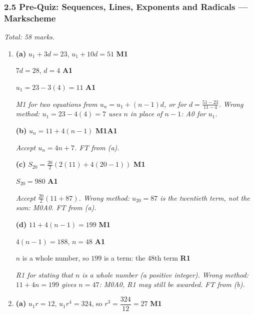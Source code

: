 \documentclass[12pt, twoside]{article}
\begin{document}
\subsubsection*{2.5 Pre-Quiz: Sequences, Lines, Exponents and Radicals --- Markscheme}

\emph{Total: 58 marks.}

\begin{enumerate}[itemsep=0.3cm]

\item[1.] [Maximum mark: 10]

\textbf{(a)} $u_{1} + 3d = 23$, \quad $u_{1} + 10d = 51$ \hfill \textbf{M1}

$7d = 28$, \quad $d = 4$ \hfill \textbf{A1}

$u_{1} = 23 - 3(4) = 11$ \hfill \textbf{A1}

\emph{M1 for two equations from $u_{n} = u_{1} + (n - 1)d$, or for
$d = \frac{51 - 23}{11 - 4}$. Wrong method: $u_{1} = 23 - 4(4) = 7$ uses
$n$ in place of $n - 1$: A0 for $u_{1}$.}

\textbf{(b)} $u_{n} = 11 + 4(n - 1)$ \hfill \textbf{M1A1}

\emph{Accept $u_{n} = 4n + 7$. FT from (a).}

\textbf{(c)} $S_{20} = \frac{20}{2}\left(2(11) + 4(20 - 1)\right)$ \hfill \textbf{M1}

$S_{20} = 980$ \hfill \textbf{A1}

\emph{Accept $\frac{20}{2}(11 + 87)$. Wrong method: $u_{20} = 87$ is the
twentieth term, not the sum: M0A0. FT from (a).}

\textbf{(d)} $11 + 4(n - 1) = 199$ \hfill \textbf{M1}

$4(n - 1) = 188$, \quad $n = 48$ \hfill \textbf{A1}

$n$ is a whole number, so $199$ is a term: the $48$th term \hfill \textbf{R1}

\emph{R1 for stating that $n$ is a whole number (a positive integer).
Wrong method: $11 + 4n = 199$ gives $n = 47$: M0A0, R1 may still be
awarded. FT from (b).}

\newpage

\item[2.] [Maximum mark: 8]

\textbf{(a)} $u_{1}r = 12$, \quad $u_{1}r^{4} = 324$, \quad so $r^{3} = \dfrac{324}{12} = 27$ \hfill \textbf{M1}


\end{enumerate}
\end{document}
